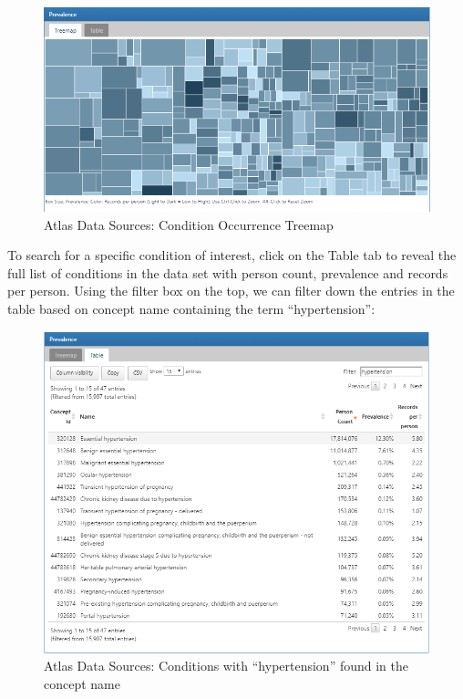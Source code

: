 \documentclass[11pt]{book}
\theoremstyle{definition}
\theoremstyle{definition}
\theoremstyle{definition}
\theoremstyle{remark}
\begin{document}
\begin{figure}

{\centering \includegraphics[width=1\linewidth]{images/Characterization/atlasDataSourcesConditionTreemap} 

}

\caption{Atlas Data Sources: Condition Occurrence Treemap}\label{fig:atlasDataSourcesConditionTreemap}
\end{figure}

To search for a specific condition of interest, click on the Table tab to reveal the full list of conditions in the data set with person count, prevalence and records per person. Using the filter box on the top, we can filter down the entries in the table based on concept name containing the term ``hypertension'':

\begin{figure}

{\centering \includegraphics[width=1\linewidth]{images/Characterization/atlasDataSourcesConditionFiltered} 

}

\caption{Atlas Data Sources: Conditions with “hypertension” found in the concept name}\label{fig:atlasDataSourcesConditionFiltered}
\end{figure}
\end{document}

